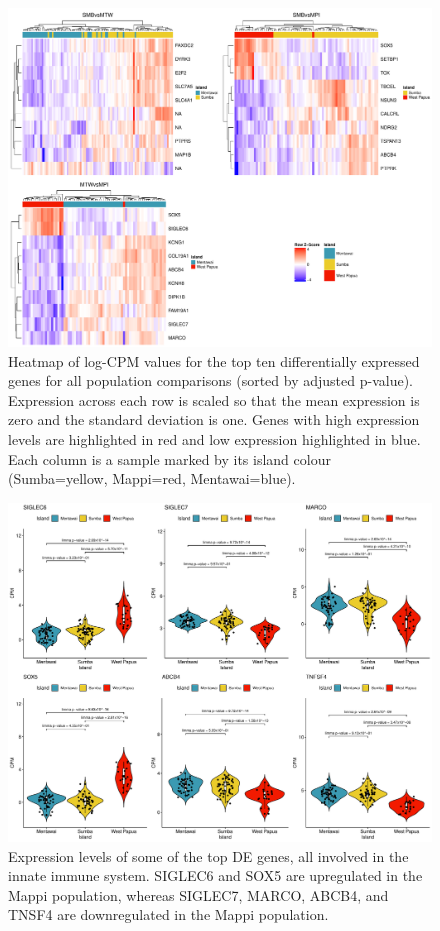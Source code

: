 \documentclass[12pt,a4paper,titlepage,twoside,openright]{book}
\begin{document}
\begin{mainmatter}
{{{\begin{figure}[htb!]
\centering
\includegraphics[width=\textwidth,height=\textheight,keepaspectratio]{Figures/HeatmapAllPops_dupCor.pdf}
\caption{Heatmap of log-CPM values for the top ten differentially expressed genes for all population comparisons (sorted by adjusted p-value). Expression across each row is scaled so that the mean expression is zero and the standard deviation is one. Genes with high expression levels are highlighted in red and low expression highlighted in blue. Each column is a sample marked by its island colour (Sumba=yellow, Mappi=red, Mentawai=blue).}
\label{fig:Heatmap Top Genes}
\end{figure}

\begin{figure}[htb!]
\centering
\includegraphics[width=\textwidth,height=\textheight,keepaspectratio]{Figures/favouriteTopGenes_distribution_Island.pdf}
\caption{Expression levels of some of the top DE genes, all involved in the innate immune system. SIGLEC6 and SOX5 are upregulated in the Mappi population, whereas SIGLEC7, MARCO, ABCB4, and TNSF4 are downregulated in the Mappi population.}
\label{fig:Heatmap Top Genes}
\end{figure}

}}}
\end{mainmatter}
\end{document}
